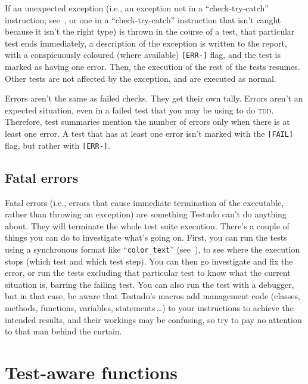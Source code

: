 \documentclass[twoside, a4paper, article]{memoir}
\newcommand*\ellipsis{\,\ldots}
\begin{document}
If an unexpected exception (i.e., an exception not in a ``check-try-catch''
instruction; see~, or one in a ``check-try-catch''
instruction that isn't caught because it isn't the right type) is thrown in the
course of a test, that particular test ends immediately, a description of the
exception is written to the report, with a conspicuously coloured (where
available) \verb|[ERR-]| flag, and the test is marked as having one error.
Then, the execution of the rest of the tests resumes.  Other tests are not
affected by the exception, and are executed as normal.

Errors aren't the same as failed checks.  They get their own tally.  Errors
aren't an expected situation, even in a failed test that you may be using to do
\textsc{tdd}.  Therefore, test summaries mention the number of errors only
when there is at least one error.  A test that has at least one error isn't
marked with the \verb|[FAIL]| flag, but rather with \verb|[ERR-]|.


\section{Fatal errors}
\label{sec:fatal-errors}

Fatal errors (i.e., errors that cause immediate termination of the executable,
rather than throwing an exception) are something Testudo can't do anything
about.  They will terminate the whole test suite execution.  There's a couple
of things you can do to investigate what's going on.  First, you can run the
tests using a synchronous format like ``\texttt{color\_text}''
(see~), to see where the execution stops (which
test and which test step).  You can then go investigate and fix the error, or
run the tests excluding that particular test to know what the current situation
is, barring the failing test.  You can also run the test with a debugger, but
in that case, be aware that Testudo's macros add management code (classes,
methods, functions, variables, statements\ellipsis{}) to your instructions to
achieve the intended results, and their workings may be confusing, so try to
pay no attention to that man behind the curtain.


\chapter{Test-aware functions}
\label{cha:test-aware-functions}
\end{document}
